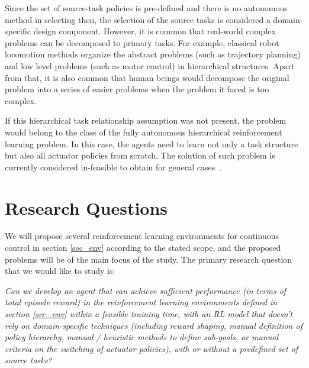 Since the set of source-task policies is pre-defined and there is no autonomous method in selecting then, the selection of the source tasks is considered a domain-specific design component. However, it is common that real-world complex problems can be decomposed to primary tasks. For example, classical robot locomotion methods organize the abstract problems (such as trajectory planning) and low level problems (such as motor control) in hierarchical structures. Apart from that, it is also common that human beings would decompose the original problem into a series of easier problems when the problem it faced is too complex.

If this hierarchical task relationship assumption was not present, the problem would belong to the class of the fully autonomous hierarchical reinforcement learning problem. In this case, the agents need to learn not only a task structure but also all actuator policies from scratch. The solution of such problem is currently considered in-feasible to obtain for general cases~\cite{barto2003recent}.


\section{Research Questions}


We will propose several reinforcement learning environments for continuous control in section \ref{sec_env} according to the stated scope, and the proposed problems will be of the main focus of the study.
The primary research question that we would like to study is:

    \textit{Can we develop an agent that can achieve sufficient performance (in terms of total episode reward) in the reinforcement learning environments defined in section \ref{sec_env} within a feasible training time, with an RL model that doesn't rely on domain-specific techniques  (including reward shaping, manual definition of policy hierarchy, manual / heuristic methods to define sub-goals, or manual criteria on the switching of actuator policies), with or without a predefined set of source tasks?}


